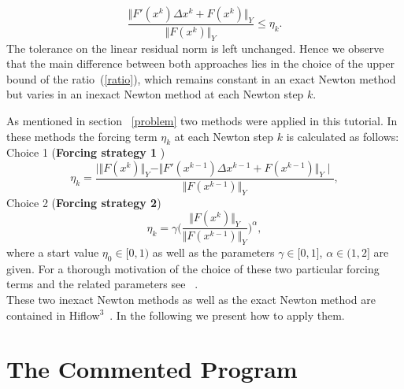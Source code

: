 \documentclass[a4paper, 11pt, twoside]{article}
\begin{document}
\begin{equation}
\frac{\Vert F'(x^k) \Delta x^k + F(x^k) \Vert_Y}{\Vert F(x^k) \Vert_Y} \leq \eta_k .
\end{equation}
The tolerance on the linear residual norm is left unchanged. Hence we observe that the main difference between both approaches lies in the choice of the upper bound of the ratio~(\ref{ratio}), which remains constant in an exact Newton method but varies in an inexact Newton method at each Newton step $k$.

As mentioned in section ~\ref{problem} two methods \cite{EW} were applied in this tutorial. In these methods the forcing term $\eta_k$ at each Newton step $k$ is calculated as follows: \\
Choice 1 (\textbf{Forcing strategy 1} )~\label{choice1}
\begin{equation}
\eta_k = \frac{\mid \Vert F(x^k) \Vert_Y - \Vert F'(x^{k-1}) \Delta x^{k-1} + F(x^{k-1}) \Vert_Y \mid}{\Vert F(x^{k-1}) \Vert_Y},
\end{equation}
Choice 2 (\textbf{Forcing strategy 2})~\label{choice2}
\begin{equation} \label{choice2}
\eta_k = \gamma \bigg( \frac{\Vert F(x^k) \Vert_Y}{\Vert F(x^{k-1}) \Vert_Y} \bigg)^{\alpha},
\end{equation}
where a start value $\eta_0 \in \lbrack 0, 1)$ as well as the parameters $\gamma \in \lbrack 0, 1\rbrack $, $\alpha \in (1, 2\rbrack$ are given. For a thorough motivation of the choice of these two particular forcing terms and the related parameters see ~\cite{EW}. \\ 
These two inexact Newton methods as well as the exact Newton method are contained in Hiflow$^3$~\cite{hiflow3:nonlinear}. In the following we present how to apply them.


\section{The Commented Program}
\end{document}
